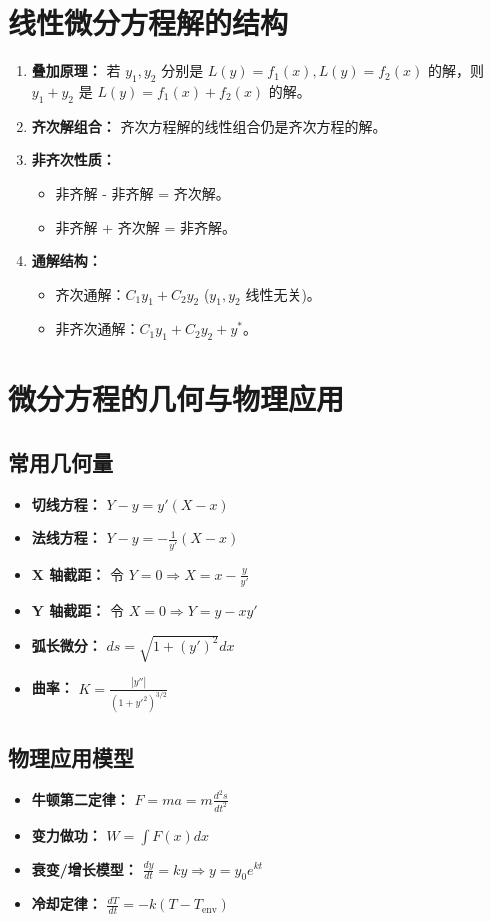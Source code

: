 \documentclass[a4paper,12pt]{ctexart}
\begin{document}
\section{线性微分方程解的结构}

\begin{enumerate}
    \item \textbf{叠加原理：} 若 $y_1, y_2$ 分别是 $L(y)=f_1(x), L(y)=f_2(x)$ 的解，则 $y_1+y_2$ 是 $L(y)=f_1(x)+f_2(x)$ 的解。
    \item \textbf{齐次解组合：} 齐次方程解的线性组合仍是齐次方程的解。
    \item \textbf{非齐次性质：}
    \begin{itemize}
        \item 非齐解 - 非齐解 = 齐次解。
        \item 非齐解 + 齐次解 = 非齐解。
    \end{itemize}
    \item \textbf{通解结构：}
    \begin{itemize}
        \item 齐次通解：$C_1 y_1 + C_2 y_2$ ($y_1, y_2$ 线性无关)。
        \item 非齐次通解：$C_1 y_1 + C_2 y_2 + y^*$。
    \end{itemize}
\end{enumerate}

\section{微分方程的几何与物理应用}

\subsection{常用几何量}
\begin{itemize}
    \item \textbf{切线方程：} $Y - y = y'(X - x)$
    \item \textbf{法线方程：} $Y - y = -\frac{1}{y'}(X - x)$
    \item \textbf{X 轴截距：} 令 $Y=0 \Rightarrow X = x - \frac{y}{y'}$
    \item \textbf{Y 轴截距：} 令 $X=0 \Rightarrow Y = y - x y'$
    \item \textbf{弧长微分：} $ds = \sqrt{1 + (y')^2} dx$
    \item \textbf{曲率：} $K = \frac{|y''|}{(1 + y'^2)^{3/2}}$
\end{itemize}

\subsection{物理应用模型}
\begin{itemize}
    \item \textbf{牛顿第二定律：} $F = ma = m \frac{d^2s}{dt^2}$
    \item \textbf{变力做功：} $W = \int F(x) dx$
    \item \textbf{衰变/增长模型：} $\frac{dy}{dt} = ky \Rightarrow y = y_0 e^{kt}$
    \item \textbf{冷却定律：} $\frac{dT}{dt} = -k(T - T_{\text{env}})$
\end{itemize}
\newpage
\end{document}
